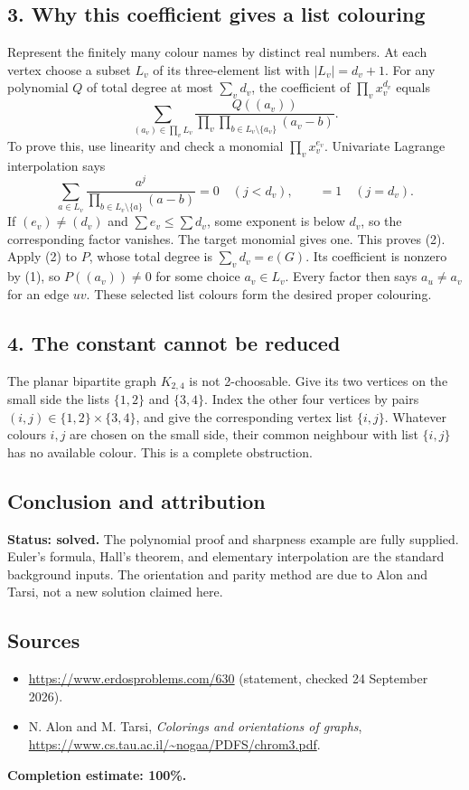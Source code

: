 \subsection*{3. Why this coefficient gives a list colouring}
Represent the finitely many colour names by distinct real numbers. At each vertex choose a subset $L_v$ of its three-element list with $|L_v|=d_v+1$. For any polynomial $Q$ of total degree at most $\sum_vd_v$, the coefficient of $\prod_vx_v^{d_v}$ equals
\[
 \sum_{(a_v)\in\prod_vL_v}
 \frac{Q((a_v))}
 {\displaystyle\prod_v\prod_{b\in L_v\setminus\{a_v\}}(a_v-b)}.
 \tag{2}
\]
To prove this, use linearity and check a monomial $\prod_vx_v^{e_v}$. Univariate Lagrange interpolation says
\[
 \sum_{a\in L_v}\frac{a^j}{\prod_{b\in L_v\setminus\{a\}}(a-b)}
 =0\quad(j<d_v),\qquad =1\quad(j=d_v).
\]
If $(e_v)\ne(d_v)$ and $\sum e_v\le\sum d_v$, some exponent is below $d_v$, so the corresponding factor vanishes. The target monomial gives one. This proves (2).
Apply (2) to $P$, whose total degree is $\sum_vd_v=e(G)$. Its coefficient is nonzero by (1), so $P((a_v))\ne0$ for some choice $a_v\in L_v$. Every factor then says $a_u\ne a_v$ for an edge $uv$. These selected list colours form the desired proper colouring.

\subsection*{4. The constant cannot be reduced}
The planar bipartite graph $K_{2,4}$ is not 2-choosable. Give its two vertices on the small side the lists $\{1,2\}$ and $\{3,4\}$. Index the other four vertices by pairs $(i,j)\in\{1,2\}\times\{3,4\}$, and give the corresponding vertex list $\{i,j\}$. Whatever colours $i,j$ are chosen on the small side, their common neighbour with list $\{i,j\}$ has no available colour. This is a complete obstruction.

\subsection*{Conclusion and attribution}
\textbf{Status: solved.} The polynomial proof and sharpness example are fully supplied. Euler's formula, Hall's theorem, and elementary interpolation are the standard background inputs. The orientation and parity method are due to Alon and Tarsi, not a new solution claimed here.

\subsection*{Sources}
\begin{itemize}
\item \url{https://www.erdosproblems.com/630} (statement, checked 24 September 2026).
\item N. Alon and M. Tarsi, \emph{Colorings and orientations of graphs}, \url{https://www.cs.tau.ac.il/~nogaa/PDFS/chrom3.pdf}.
\end{itemize}
\noindent\textbf{Completion estimate: 100\%.}
